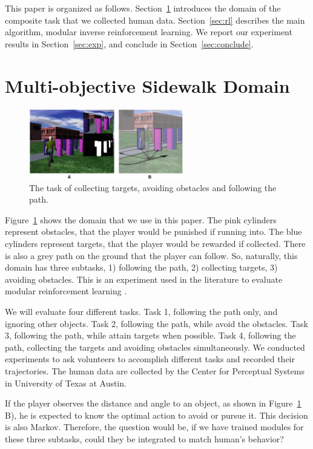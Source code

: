 \documentclass[11pt]{article} %
\begin{document}
This paper is organized as follows. Section~\ref{sec:domain} introduces the
domain of the composite task that we collected human data. Section~\ref{sec:rl}
describes the main algorithm, modular inverse reinforcement learning. We report
our experiment results in Section~\ref{sec:exp}, and conclude in
Section~\ref{sec:conclude}.

\section{Multi-objective Sidewalk Domain}
\label{sec:domain}

\begin{figure}[h!]
\centering
\includegraphics[width=0.6\textwidth]{avatar.png}
\caption{The task of collecting targets, avoiding obstacles and following the
path. \cite{rothkopf2013modular}}
\label{fig:avatar}
\end{figure}

Figure~\ref{fig:avatar} shows the domain that we use in this paper. The pink
cylinders represent obstacles, that the player would be punished if running
into. The blue cylinders represent targets, that the player would be rewarded if
collected. There is also a grey path on the ground that the player can follow.
So, naturally, this domain has three subtasks, 1) following the path, 2)
collecting targets, 3) avoiding obstacles. This is an experiment used in the
literature to evaluate modular reinforcement learning
\cite{rothkopf2013modular}.

We will evaluate four different tasks. Task 1, following the path only, and
ignoring other objects. Task 2, following the path, while avoid the obstacles.
Task 3, following the path, while attain targets when possible.  Task 4,
following the path, collecting the targets and avoiding obstacles
simultaneously.
We conducted experiments to ask volunteers to accomplish different tasks and
recorded their trajectories. The human data are collected by the Center for
Perceptual Systems in University of Texas at Austin.

If the player observes the distance and angle to an object, as shown in
Figure~\ref{fig:avatar} B), he is expected to know the optimal action to avoid
or pursue it. This decision is also Markov. Therefore, the question would be, if
we have trained modules for these three subtasks, could they be integrated to
match human's behavior?
\end{document}
